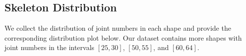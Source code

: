 \subsection{Skeleton Distribution}

We collect the distribution of joint numbers in each shape and provide the corresponding distribution plot below. Our dataset contains more shapes with joint numbers in the intervals $[25,30]$, $[50,55]$, and $[60,64]$.


